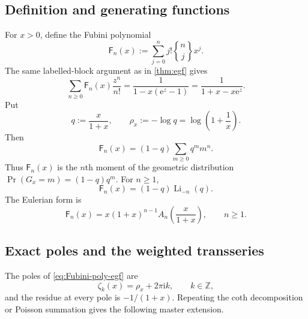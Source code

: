 \documentclass[11pt,a4paper,oneside]{article}
\theoremstyle{definition}
\theoremstyle{remark}
\newcommand{\Fub}{\mathsf{F}}
\newcommand{\StirlingII}[2]{\genfrac\{\}{0pt}{}{#1}{#2}}
\newcommand{\Li}{\operatorname{Li}}
\newcommand{\e}{\mathrm{e}}
\newcommand{\ii}{\mathrm{i}}
\begin{document}
\subsection{Definition and generating functions}
For $x>0$, define the Fubini polynomial
\begin{equation}\label{eq:Fubini-poly-def}
 \Fub_n(x):=\sum_{j=0}^{n}j!\StirlingII{n}{j}x^j.
\end{equation}
The same labelled-block argument as in \cref{thm:egf} gives
\begin{equation}\label{eq:Fubini-poly-egf}
 \sum_{n\ge0}\Fub_n(x)\frac{z^n}{n!}
 =\frac{1}{1-x(\e^z-1)}
 =\frac{1}{1+x-x\e^z}.
\end{equation}
Put
\begin{equation}\label{eq:q-rhox}
 q:=\frac{x}{1+x},
 \qquad
 \rho_x:=-\log q=\log\!\left(1+\frac1x\right).
\end{equation}
Then
\begin{equation}\label{eq:weighted-moment}
 \Fub_n(x)=(1-q)\sum_{m\ge0}q^m m^n.
\end{equation}
Thus $\Fub_n(x)$ is the $n$th moment of the geometric distribution
$\Pr(G_x=m)=(1-q)q^m$.  For $n\ge1$,
\begin{equation}\label{eq:weighted-polylog}
 \Fub_n(x)=(1-q)\Li_{-n}(q).
\end{equation}
The Eulerian form is
\begin{equation}\label{eq:weighted-eulerian}
 \Fub_n(x)=x(1+x)^{n-1}
 A_n\!\left(\frac{x}{1+x}\right),
 \qquad n\ge1.
\end{equation}

\subsection{Exact poles and the weighted transseries}
The poles of \cref{eq:Fubini-poly-egf} are
\[
 \zeta_k(x)=\rho_x+2\pi\ii k,
 \qquad k\in\mathbb Z,
\]
and the residue at every pole is $-1/(1+x)$.  Repeating the coth decomposition
or Poisson summation gives the following master extension.
\end{document}
